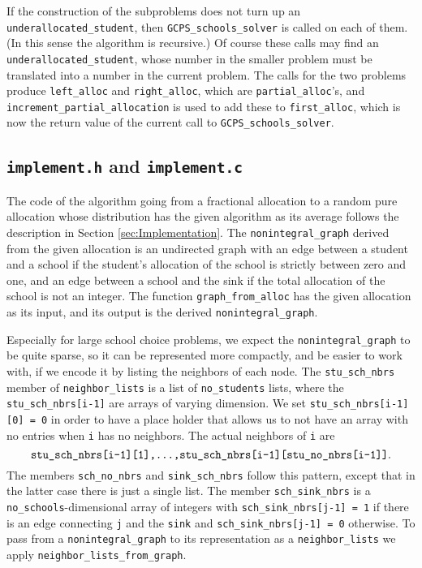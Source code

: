 \documentclass[12pt]{article}
\theoremstyle{definition}
\begin{document}
\begin{appendix}
If the construction of the subproblems does not turn up an
\texttt{underallocated\_student}, then \texttt{GCPS\_schools\_solver}
is called on each of them. (In this sense the algorithm is recursive.)
Of course these calls may find an \texttt{underallocated\_student},
whose number in the smaller problem must be translated into a number
in the current problem.  The calls for the two problems produce
\texttt{left\_alloc} and \texttt{right\_alloc}, which are
\texttt{partial\_alloc}'s, and \texttt{increment\_partial\_allocation}
is used to add these to \texttt{first\_alloc}, which is now the return
value of the current call to \texttt{GCPS\_schools\_solver}.

\subsection{\texttt{implement.h} and \texttt{implement.c}}

The code of the algorithm going from a fractional allocation to a
random pure allocation whose distribution has the given algorithm as
its average follows the description in Section
\ref{sec:Implementation}.  The \texttt{nonintegral\_graph} derived
from the given allocation is an undirected graph with an edge between
a student and a school if the student's allocation of the school is
strictly between zero and one, and an edge between a school and the
sink if the total allocation of the school is not an integer.  The
function \texttt{graph\_from\_alloc} has the given allocation as its
input, and its output is the derived \texttt{nonintegral\_graph}.

Especially for large school choice problems, we expect the
\texttt{nonintegral\_graph} to be quite sparse, so it can be
represented more compactly, and be easier to work with, if we encode
it by listing the neighbors of each node.  The \texttt{stu\_sch\_nbrs}
member of \texttt{neighbor\_lists} is a list of \texttt{no\_students}
lists, where the \texttt{stu\_sch\_nbrs[i-1]} are arrays of varying
dimension. We set \texttt{stu\_sch\_nbrs[i-1][0] = 0} in order to have
a place holder that allows us to not have an array with no entries
when \texttt{i} has no neighbors.  The actual neighbors of \texttt{i}
are
$$\text{\texttt{stu\_sch\_nbrs[i-1][1],...,stu\_sch\_nbrs[i-1][stu\_no\_nbrs[i-1]]}}.$$
The members \texttt{sch\_no\_nbrs} and \texttt{sink\_sch\_nbrs} follow
this pattern, except that in the latter case there is just a single
list.  The member \texttt{sch\_sink\_nbrs} is a
\texttt{no\_schools}-dimensional array of integers with
\texttt{sch\_sink\_nbrs[j-1] = 1} if there is an edge connecting
\texttt{j} and the \texttt{sink} and \texttt{sch\_sink\_nbrs[j-1] = 0}
otherwise.  To pass from a \texttt{nonintegral\_graph} to its
representation as a \texttt{neighbor\_lists} we apply
\texttt{neighbor\_lists\_from\_graph}.


\end{appendix}
\end{document}

